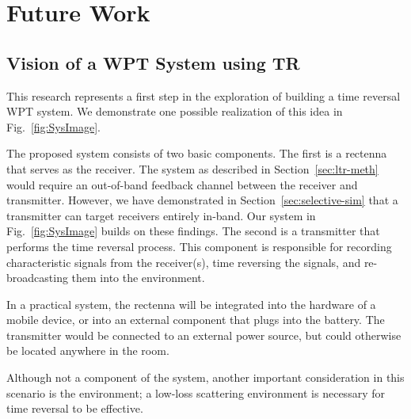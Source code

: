 \chapter{Future Work}
\label{ch:future}


\section{Vision of a WPT System using TR}
\label{sec:future-roadmap}
This research represents a first step in the exploration of building a
time reversal WPT system.
%
We demonstrate one possible realization of this idea in Fig.~\ref{fig:SysImage}.


The proposed system consists of two basic components.
%
The first is a rectenna that serves as the receiver.
%
The system as described in Section~\ref{sec:ltr-meth} would require an
out-of-band feedback channel between the receiver and transmitter. However, we
have demonstrated in Section~\ref{sec:selective-sim} that a transmitter can target
receivers entirely in-band.
%
Our system in Fig.~\ref{fig:SysImage} builds on these findings.
%
The second is a transmitter that performs the time reversal process.
%
This component is responsible for recording characteristic signals from the
receiver(s), time reversing the signals, and re-broadcasting them into the
environment.



In a practical system, the rectenna will be integrated into the hardware of a
mobile device, or into an external component that plugs into the battery.
%
The transmitter would  be connected to an external power source, but
could otherwise be located anywhere in the room.

Although not a component of the system, another important consideration in this
scenario is the environment; a low-loss scattering environment is necessary for
time reversal to be effective.

